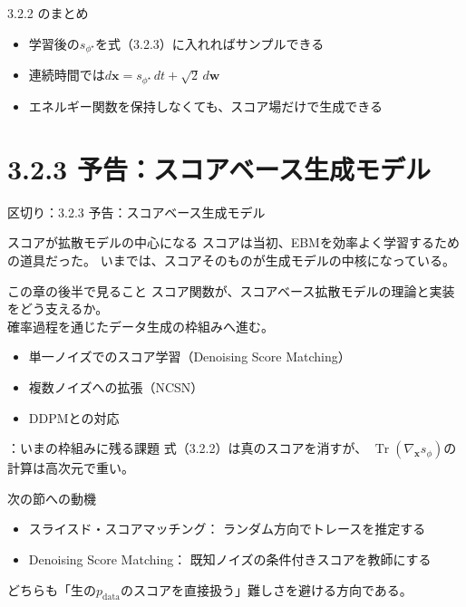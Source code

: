 \asmain
\begin{frame}{3.2.2 のまとめ}
    \begin{itemize}
        \item 学習後の$s_{\phi^\star}$を式（3.2.3）に入れればサンプルできる
        \item 連続時間では$d\bm{x}=s_{\phi^\star}\,dt+\sqrt{2}\,d\bm{w}$
        \item エネルギー関数を保持しなくても、スコア場だけで生成できる
    \end{itemize}
\end{frame}
\section{3.2.3 予告：スコアベース生成モデル}
\asmain
\begin{frame}{区切り：3.2.3 予告：スコアベース生成モデル}
    \tableofcontents[currentsection]
\end{frame}
\asmain
\begin{frame}{スコアが拡散モデルの中心になる}
    スコアは当初、EBMを効率よく学習するための道具だった。
    いまでは、スコアそのものが生成モデルの中核になっている。
    \begin{block}{この章の後半で見ること}
        スコア関数が、スコアベース拡散モデルの理論と実装をどう支えるか。\\
        確率過程を通じたデータ生成の枠組みへ進む。
    \end{block}
    \begin{itemize}
        \item 単一ノイズでのスコア学習（Denoising Score Matching）
        \item 複数ノイズへの拡張（NCSN）
        \item DDPMとの対応
    \end{itemize}
\end{frame}
\assuppl
\begin{frame}{\supplmark：いまの枠組みに残る課題}
    式（3.2.2）は真のスコアを消すが、
    $\operatorname{Tr}(\nabla_{\bm{x}}s_\phi)$の計算は高次元で重い。
    \begin{exampleblock}{次の節への動機}
        \begin{itemize}
            \item スライスド・スコアマッチング：
            ランダム方向でトレースを推定する
            \item Denoising Score Matching：
            既知ノイズの条件付きスコアを教師にする
        \end{itemize}
        どちらも「生の$p_{\mathrm{data}}$のスコアを直接扱う」難しさを避ける方向である。
    \end{exampleblock}
\end{frame}
